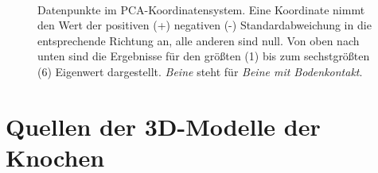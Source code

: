 \begin{figure}
   \\
   \qquad
   
   \caption{Datenpunkte im PCA-Koordinatensystem. Eine Koordinate nimmt den Wert der positiven (+) \bzw negativen (-) Standardabweichung in die entsprechende Richtung an, alle anderen sind null. Von oben nach unten sind die Ergebnisse für den größten (1) bis zum sechstgrößten (6) Eigenwert dargestellt. \emph{Beine} steht für \emph{Beine mit Bodenkontakt}.}
   \label{pca_results_sqrtEV}
  \end{figure}
  
  
\chapter{Quellen der 3D-Modelle der Knochen}
\label{model_sources}

